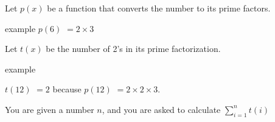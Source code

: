 Let $p(x)$ be a function that converts the number to its prime factors.

example
$p(6)$ $ = 2 \times 3$

Let $t(x)$ be the number of 2's in its prime factorization.

example 

$t(12)$ $= 2$ because $ p(12) $ $ = 2 \times 2 \times 3$.

You are given a number $n$, and you are asked to calculate ${\sum_{i = 1}^n t(i)}$
